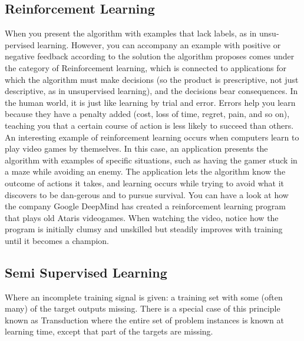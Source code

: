 \documentclass[12pt]{article}
\begin{document}
{\subsection{Reinforcement Learning}
When you present the algorithm with examples that lack labels, as in unsu-pervised learning. However, you can accompany an example with positive or negative feedback according to the solution the algorithm proposes comes under the category of Reinforcement learning, which is connected to applications for which the algorithm must make decisions (so the product is prescriptive, not just descriptive, as in unsupervised learning), and the decisions bear consequences. In the human world, it is just like learning by trial and error.
Errors help you learn because they have a penalty added (cost, loss of time, regret, pain, and so on), teaching you that a certain course of action is less likely to succeed than others. An interesting example of reinforcement learning occurs when computers learn to play video games by themselves.
In this case, an application presents the algorithm with examples of specific situations, such as having the gamer stuck in a maze while avoiding an enemy. The application lets the algorithm know the outcome of actions it takes, and learning occurs while trying to avoid what it discovers to be dan-gerous and to pursue survival. You can have a look at how the company Google DeepMind has created a reinforcement learning program that plays old Atari\textquotesingle s videogames. When watching the video, notice how the program is initially clumsy and unskilled but steadily improves with training until it becomes a champion.

\subsection{Semi Supervised Learning}
Where an incomplete training signal is given: a training set with some (often many) of the target outputs missing. There is a special case of this principle known as Transduction where the entire set of problem instances is known at learning time, except that part of the targets are missing.

}
\end{document}
